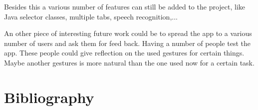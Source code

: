 \documentclass[a4paper,12pt]{report}
\begin{document}
Besides this a various number of features can still be added to the project, like Java selector classes, multiple tabs, speech recognition,...

An other piece of interesting future work could be to spread the app to a various number of users and ask them for feed back. Having a number of people test the app. These people could give reflection on the 
used gestures for certain things. Maybe another gestures is more natural than the one used now for a certain task.




\chapter{Bibliography}
\end{document}
